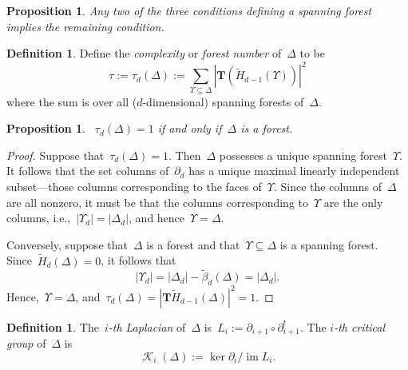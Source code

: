 \documentclass[12pt]{article}
\newcommand{\T}{\mathbf{T}}
\newcommand{\tH}{\widetilde{H}}
\newcommand{\tb}{\tilde{\beta}}
\DeclareMathOperator{\im}{\mathrm{im}}
\DeclareMathOperator{\crit}{\mathcal{K}}
\newtheorem{prop}[theorem]{Proposition}
\theoremstyle{definition}
\newtheorem{definition}[theorem]{Definition}
\theoremstyle{remark}
\begin{document}
\begin{prop} Any two of the three conditions defining a spanning forest implies
  the remaining condition.
\end{prop}

\begin{definition}  Define the {\em complexity} or {\em forest number} of~$\Delta$ to be
  \[
    \tau:=\tau_d(\Delta):=\sum_{\Upsilon\subseteq\Delta}|\T(\tH_{d-1}(\Upsilon))|^2
  \]
  where the sum is over all ($d$-dimensional) spanning forests of~$\Delta$.
\end{definition}

\begin{prop}~$\tau_d(\Delta)=1$ if and only if~$\Delta$ is a forest.
\end{prop}
\begin{proof} 
  Suppose that~$\tau_d(\Delta)=1$.  Then~$\Delta$ possesses a unique spanning
  forest~$\Upsilon$.  It follows that the set columns of~$\partial_d$ has a unique
  maximal linearly independent subset---those columns corresponding to the faces
  of~$\Upsilon$.  Since the columns of~$\Delta$ are all nonzero, it must be that
  the columns corresponding to~$\Upsilon$ are the only columns,
  i.e.,~$|\Upsilon_d|=|\Delta_d|$, and hence~$\Upsilon=\Delta$.
  
  Conversely, suppose that~$\Delta$ is a forest and
  that~$\Upsilon\subseteq\Delta$ is a spanning forest.  Since~$\tH_d(\Delta)=0$,
  it follows that
  \[
    |\Upsilon_d|=|\Delta_d|-\tb_d(\Delta)=|\Delta_d|.
  \]
  Hence,~$\Upsilon=\Delta$, and~$\tau_d(\Delta)=|\T\tH_{d-1}(\Delta)|^2=1$.
\end{proof}

\begin{definition}  The~{\em $i$-th Laplacian} of~$\Delta$
  is~$L_i:=\partial_{i+1}\circ\partial_{i+1}^t$.  The {\em $i$-th critical
  group} of~$\Delta$ is
  \[
    \crit_i(\Delta):=\ker\partial_i/\im L_i.
  \]
\end{definition}
\end{document}
